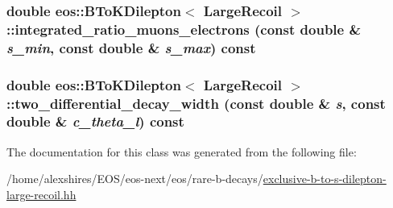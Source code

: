 \label{classeos_1_1BToKDilepton_3_01LargeRecoil_01_4_a0c327b43113802ce26301ebe6948a718}
\hypertarget{classeos_1_1BToKDilepton_3_01LargeRecoil_01_4_a8d86b023702dff71ea43ff12acc159a8}{
\subsubsection[{integrated\_\-ratio\_\-muons\_\-electrons}]{\setlength{\rightskip}{0pt plus 5cm}double eos::BToKDilepton$<$ {\bf LargeRecoil} $>$::integrated\_\-ratio\_\-muons\_\-electrons (const double \& {\em s\_\-min}, \/  const double \& {\em s\_\-max}) const}}
\label{classeos_1_1BToKDilepton_3_01LargeRecoil_01_4_a8d86b023702dff71ea43ff12acc159a8}
\hypertarget{classeos_1_1BToKDilepton_3_01LargeRecoil_01_4_acc340e2646eb88b5709c12d520c06a2a}{
\subsubsection[{two\_\-differential\_\-decay\_\-width}]{\setlength{\rightskip}{0pt plus 5cm}double eos::BToKDilepton$<$ {\bf LargeRecoil} $>$::two\_\-differential\_\-decay\_\-width (const double \& {\em s}, \/  const double \& {\em c\_\-theta\_\-l}) const}}
\label{classeos_1_1BToKDilepton_3_01LargeRecoil_01_4_acc340e2646eb88b5709c12d520c06a2a}


The documentation for this class was generated from the following file:\begin{DoxyCompactItemize}
\item 
/home/alexshires/EOS/eos-\/next/eos/rare-\/b-\/decays/\hyperlink{exclusive-b-to-s-dilepton-large-recoil_8hh}{exclusive-\/b-\/to-\/s-\/dilepton-\/large-\/recoil.hh}\end{DoxyCompactItemize}
